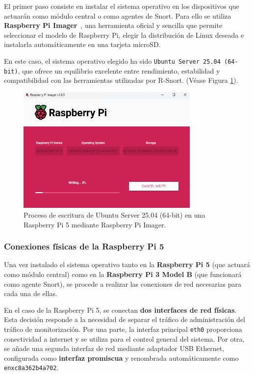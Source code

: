 \documentclass[11pt,a4paper,twoside]{report}
\begin{document}
El primer paso consiste en instalar el sistema operativo en los dispositivos que actuarán como módulo central o como agentes de Snort. Para ello se utiliza \textbf{Raspberry Pi Imager}~\cite{raspberrypi_software}, una herramienta oficial y sencilla que permite seleccionar el modelo de Raspberry Pi, elegir la distribución de Linux deseada e instalarla automáticamente en una tarjeta microSD.\newline

En este caso, el sistema operativo elegido ha sido \texttt{Ubuntu Server 25.04 (64-bit)}, que ofrece un equilibrio excelente entre rendimiento, estabilidad y compatibilidad con las herramientas utilizadas por R-Snort. (Véase Figura \ref{fig:preparacion-sistema}).

\begin{figure}[H]
	\centering
	\includegraphics[width=0.8\textwidth]{install/1.png}
	\caption{Proceso de escritura de Ubuntu Server 25.04 (64-bit) en una Raspberry Pi 5 mediante Raspberry Pi Imager.}
	\label{fig:preparacion-sistema}
\end{figure}

\subsubsection{Conexiones físicas de la Raspberry Pi 5}

Una vez instalado el sistema operativo tanto en la \textbf{Raspberry Pi 5} (que actuará como módulo central) como en la \textbf{Raspberry Pi 3 Model B} (que funcionará como agente Snort), se procede a realizar las conexiones de red necesarias para cada una de ellas.\newline

En el caso de la Raspberry Pi 5, se conectan \textbf{dos interfaces de red físicas}. Esta decisión responde a la necesidad de separar el tráfico de administración del tráfico de monitorización. Por una parte, la interfaz principal \texttt{eth0} proporciona conectividad a internet y se utiliza para el control general del sistema. Por otra, se añade una segunda interfaz de red mediante adaptador USB Ethernet, configurada como \textbf{interfaz promiscua} y renombrada automáticamente como \texttt{enxc8a362b4a702}.\newline
\end{document}
